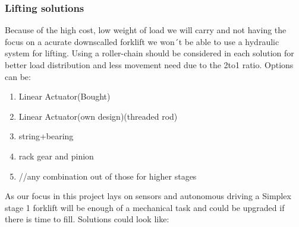 \documentclass[../report.tex]{subfiles}
\begin{document}
\subsubsection{Lifting solutions}
Because of the high cost, low weight of load we will carry and not having the focus on a acurate downscalled 
forklift we won´t be able to use a hydraulic system for lifting.
Using a roller-chain should be considered in each solution for better load distribution and less movement need due to the 2to1
ratio.
Options can be:
\begin{enumerate}
    \item Linear Actuator(Bought)
    \item Linear Actuator(own design)(threaded rod)
    \item string+bearing 
    \item rack gear and pinion
    \item //any combination out of those for higher stages
\end{enumerate}
As our focus in this project lays on sensors and autonomous driving a Simplex stage 1 forklift will be enough of a mechanical 
task and could be upgraded if there is time to fill. 
Solutions could look like:
\end{document}
